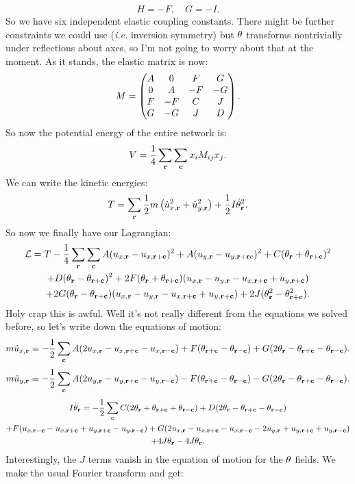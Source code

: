 \documentclass[12pt]{article}
\begin{document}
\[ H = -F, \quad G = -I.\]
So we have six independent elastic coupling constants. There might be further constraints we could use (\emph{i.e.} inversion symmetry) but $\theta$ transforms nontrivially under reflections about axes, so I'm not going to worry about that at the moment. As it stands, the elastic matrix is now:
\[ M = \left(\begin{matrix}A & 0 & F & G \\ 0 & A & -F & -G \\ F & -F & C & J \\ G & -G & J & D\end{matrix}\right).\]
So now the potential energy of the entire network is:
\[ V = \frac{1}{4}\sum_{\mathbf{r}} \sum_{\mathbf{c}} x_i M_{ij} x_j.\]
We can write the kinetic energies:
\[ T = \sum_{\mathbf{r}} \frac{1}{2}m\left(\dot u_{x,\mathbf{r}}^2 + \dot u_{y,\mathbf{r}}^2\right) + \frac{1}{2} I \dot {\theta}_{\mathbf{r}}^2.\]
So now we finally have our Lagrangian:
\begin{multline*}  \mathcal{L} = T - \frac{1}{4}\sum_{\mathbf{r}}\sum_{\mathbf{c}}A(u_{x,\mathbf{r}}-u_{x,\mathbf{r}+\mathbf{c}})^2 +A(u_{y,\mathbf{r}}-u_{y,\mathbf{r}+\mathbf{r} c})^2 + C(\theta_{\mathbf{r}} + \theta_{\mathbf{r}+\mathbf{c}})^2\\ + D(\theta_{\mathbf{r}} - \theta_{\mathbf{r}+\mathbf{c}})^2 + 2F(\theta_{\mathbf{r}} + \theta_{\mathbf{r} + \mathbf{c}})(u_{x,\mathbf{r}}-u_{y,\mathbf{r}} - u_{x,\mathbf{r}+\mathbf{c}} + u_{y,\mathbf{r}+\mathbf{c}})\\ + 2G (\theta_{\mathbf{r}} - \theta_{\mathbf{r}+\mathbf{c}})(u_{x,\mathbf{r}}-u_{y,\mathbf{r}} - u_{x,\mathbf{r}+\mathbf{c}} + u_{y,\mathbf{r}+\mathbf{c}}) + 2 J(\theta_{\mathbf{r}}^2 - \theta_{\mathbf{r}+\mathbf{c}}^2). \end{multline*}
Holy crap this is awful. Well it's not really different from the equations we solved before, so let's write down the equations of motion:
\[ m \ddot u_{x,\mathbf{r}} = -\frac{1}{2}\sum_{\mathbf{c}} A(2u_{x,\mathbf{r}} - u_{x,\mathbf{r}+\mathbf{c}}-u_{x,\mathbf{r} - \mathbf{c}}) + F(\theta_{\mathbf{r}+\mathbf{c}} - \theta_{\mathbf{r} - \mathbf{c}}) + G(2\theta_{\mathbf{r}} - \theta_{\mathbf{r}+\mathbf{c}} - \theta_{\mathbf{r} -\mathbf{c}}).\] 
\[ m \ddot u_{y,\mathbf{r}} = -\frac{1}{2}\sum_{\mathbf{c}} A(2u_{y,\mathbf{r}} - u_{y,\mathbf{r}+\mathbf{c}}-u_{y,\mathbf{r} - \mathbf{c}}) - F(\theta_{\mathbf{r}+\mathbf{c}} - \theta_{\mathbf{r} - \mathbf{c}}) - G(2\theta_{\mathbf{r}} - \theta_{\mathbf{r}+\mathbf{c}} - \theta_{\mathbf{r} -\mathbf{c}}).\]
\begin{multline*} I \ddot {\theta}_{\mathbf{r}} = -\frac{1}{2} \sum_{\mathbf{c}} C(2\theta_{\mathbf{r}} + \theta_{\mathbf{r} + \mathbf{c}} + \theta_{\mathbf{r} - \mathbf{c}}) + D(2\theta_{\mathbf{r}} - \theta_{\mathbf{r} + \mathbf{c}} - \theta_{\mathbf{r} - \mathbf{c}})\\ + F(u_{x,\mathbf{r} - \mathbf{c}} - u_{x,\mathbf{r} + \mathbf{c}} + u_{y,\mathbf{r} + \mathbf{c}} - u_{y, \mathbf{r} - \mathbf{c}}) + G(2u_{x,\mathbf{r}} - u_{x,\mathbf{r}+\mathbf{c}} - u_{x,\mathbf{r} - \mathbf{c}} -2 u_{y,\mathbf{r}} + u_{y,\mathbf{r}+\mathbf{c}} + u_{y,\mathbf{r} - \mathbf{c}})\\ + 4J\theta_{\mathbf{r}} - 4J\theta_{\mathbf{r}}. \end{multline*}
Interestingly, the $J$ terms vanish in the equation of motion for the $\theta$ fields. We make the usual Fourier transform and get:
\end{document}
